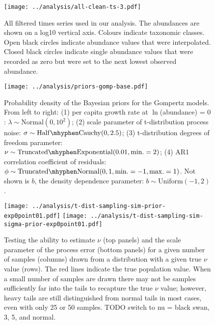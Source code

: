\clearpage
\renewcommand{\thetable}{S\arabic{table}}
\setcounter{table}{0}

\clearpage


\renewcommand{\thefigure}{S\arabic{figure}}
\setcounter{figure}{0}

\begin{figure}[htbp]
\begin{center}
\texttt{[image: ../analysis/all-clean-ts-3.pdf]}
\caption{
  All filtered times series used in our analysis. The abundances are shown on
  a log10 vertical axis. Colours indicate taxonomic classes. Open black circles
  indicate abundance values that were interpolated. Closed black circles
  indicate single abundance values that were recorded as zero but were set to
  the next lowest observed abundance.
}
    \label{fig:all-ts}
\end{center}
\end{figure}

\clearpage

\begin{figure}[htbp]
\begin{center}
\texttt{[image: ../analysis/priors-gomp-base.pdf]}
\caption{
  Probability density of the Bayesian priors for the Gompertz models. From left
  to right: (1) per capita growth rate at $\ln$(abundance) = $0$: $\lambda \sim
  \mathrm{Normal}(0, 10^2)$; (2) scale parameter of t-distribution process
  noise: $\sigma \sim \mathrm{Half\mhyphen Cauchy} (0,
  2.5)$; (3) t-distribution degrees of freedom parameter: $\nu \sim
  \mathrm{Truncated\mhyphen Exponential}(0.01, \mathrm{min.} = 2)$; (4) AR1
  correlation coefficient of residuals: $\phi \sim \mathrm{Truncated \mhyphen
    Normal}(0, 1, \mathrm{min.} = -1, \mathrm{max.} = 1)$. Not shown is $b$,
  the density dependence parameter: $b \sim \mathrm{Uniform}(-1, 2)$.
}
  \label{fig:priors}
\end{center}
\end{figure}

\clearpage

\begin{figure}[htbp]
\begin{center}
\texttt{[image: ../analysis/t-dist-sampling-sim-prior-exp0point01.pdf]}
\texttt{[image: ../analysis/t-dist-sampling-sim-sigma-prior-exp0point01.pdf]}
\caption{
  Testing the ability to estimate $\nu$ (top panels) and the scale parameter of
  the process error (bottom panels) for a given number of samples (columns)
  drawn from a distribution with a given true $\nu$ value (rows). The red lines
  indicate the true population value. When a small number of samples are drawn
  there may not be samples sufficiently far into the tails to recapture the
  true $\nu$ value; however, heavy tails are still distinguished from normal
  tails in most cases, even with only 25 or 50 samples. TODO switch to nu
  = black swan, 3, 5, and normal.
}
\label{fig:sim-nu}
\end{center}
\end{figure}

